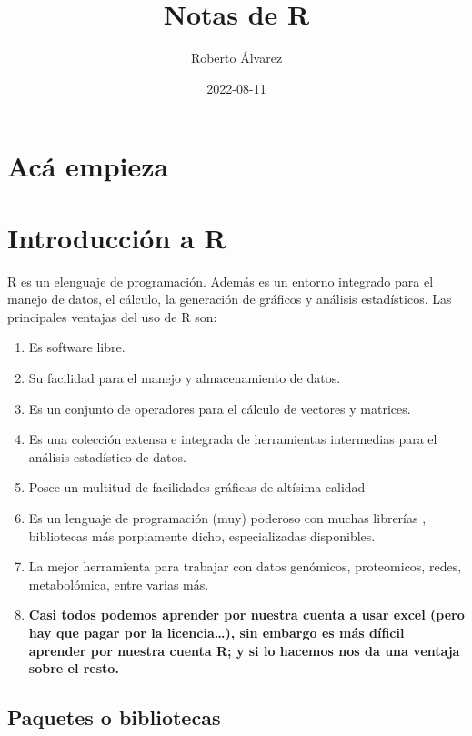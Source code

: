 \documentclass[
]{book}
\title{Notas de R}
\author{Roberto Álvarez}
\date{2022-08-11}
\providecommand{\tightlist}{%
  \setlength{\itemsep}{0pt}\setlength{\parskip}{0pt}}
\begin{document}
\maketitle

{
\setcounter{tocdepth}{1}
\tableofcontents
}
\hypertarget{acuxe1-empieza}{%
\chapter{Acá empieza}\label{acuxe1-empieza}}

\hypertarget{intro}{%
\chapter{Introducción a R}\label{intro}}

R es un elenguaje de programación. Además es un entorno integrado para el manejo de datos, el cálculo, la generación de gráficos y análisis estadísticos.
Las principales ventajas del uso de R son:

\begin{enumerate}
\def\labelenumi{\arabic{enumi}.}
\tightlist
\item
  Es software libre.
\item
  Su facilidad para el manejo y almacenamiento de datos.
\item
  Es un conjunto de operadores para el cálculo de vectores y matrices.
\item
  Es una colección extensa e integrada de herramientas intermedias para el análisis estadístico de datos.
\item
  Posee un multitud de facilidades gráficas de altísima calidad
\item
  Es un lenguaje de programación (muy) poderoso con muchas librerías , bibliotecas más porpiamente dicho, especializadas disponibles.
\item
  La mejor herramienta para trabajar con datos genómicos, proteomicos, redes, metabolómica, entre varias más.
\item
  \textbf{Casi todos podemos aprender por nuestra cuenta a usar excel (pero hay que pagar por la licencia\ldots), sin embargo es más díficil aprender por nuestra cuenta R; y si lo hacemos nos da una ventaja sobre el resto.}
\end{enumerate}

\hypertarget{paquetes-o-bibliotecas}{%
\section{Paquetes o bibliotecas}\label{paquetes-o-bibliotecas}}
\end{document}
